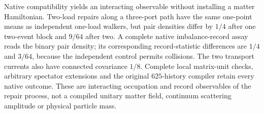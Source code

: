 Native compatibility yields an interacting observable without installing a
matter Hamiltonian. Two-load repairs along a three-port path have the same
one-point means as independent one-load walkers, but pair densities differ
by $1/4$ after one two-event block and $9/64$ after two. A complete native
imbalance-record assay reads the binary pair density; its corresponding
record-statistic differences are $1/4$ and $3/64$, because the independent
control permits collisions. The two transport currents also have connected
covariance $1/8$. Complete local matrix-unit checks, arbitrary spectator
extensions and the original $625$-history compiler retain every native
outcome. These are interacting occupation and record observables of the
repair process, not a compiled unitary matter field, continuum scattering
amplitude or physical particle mass.
